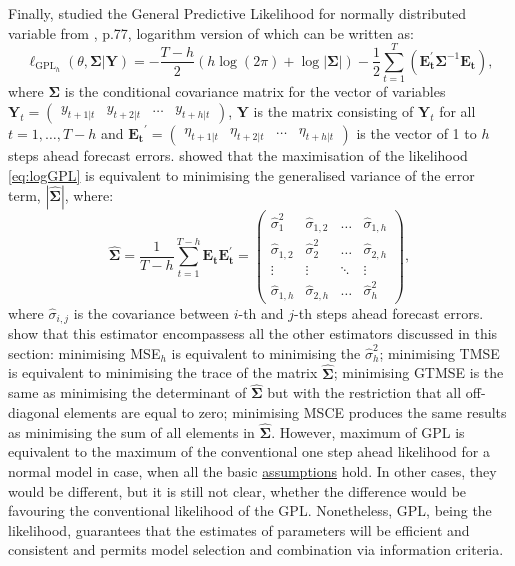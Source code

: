 \documentclass[
]{book}
\theoremstyle{definition}
\theoremstyle{definition}
\theoremstyle{definition}
\theoremstyle{definition}
\theoremstyle{remark}
\begin{document}
Finally, \citet{Svetunkov2020Multistep} studied the General Predictive Likelihood for normally distributed variable from \citet{Clements1998}, p.77, logarithm version of which can be written as:
\begin{equation}
    \ell_{\mathrm{GPL}_h}(\theta, \mathbf{{\Sigma}} | \mathbf{Y}) = -\frac{T-h}{2} \left( h \log(2 \pi) + \log | \mathbf{{\Sigma}}| \right) -\frac{1}{2} \sum_{t=1}^T \left( \mathbf{E_t^\prime} \mathbf{{\Sigma}}^{-1} \mathbf{E_t} \right) ,
  \label{eq:logGPL}
\end{equation}
where \(\mathbf{{\Sigma}}\) is the conditional covariance matrix for the vector of variables \(\mathbf{Y}_t=\begin{pmatrix} y_{t+1|t} & y_{t+2|t} & \ldots & y_{t+h|t} \end{pmatrix}\), \(\mathbf{Y}\) is the matrix consisting of \(\mathbf{Y}_t\) for all \(t=1, \ldots, T-h\) and \(\mathbf{E_t}^{\prime} = \begin{pmatrix} \eta_{t+1|t} & \eta_{t+2|t} & \ldots & \eta_{t+h|t} \end{pmatrix}\) is the vector of 1 to \(h\) steps ahead forecast errors. \citet{Svetunkov2020Multistep} showed that the maximisation of the likelihood \eqref{eq:logGPL} is equivalent to minimising the generalised variance of the error term, \(|\mathbf{\hat{\Sigma}}|\), where:
\begin{equation}
    \mathbf{\hat{\Sigma}} = \frac{1}{T-h} \sum_{t=1}^{T-h} \mathbf{E_t} \mathbf{E_t^\prime} =
    \begin{pmatrix}
        \hat{\sigma}_1^2 & \hat{\sigma}_{1,2} & \dots & \hat{\sigma}_{1,h} \\
        \hat{\sigma}_{1,2} & \hat{\sigma}_2^2 & \dots & \hat{\sigma}_{2,h} \\
        \vdots & \vdots & \ddots & \vdots \\
        \hat{\sigma}_{1,h} & \hat{\sigma}_{2,h} & \dots & \hat{\sigma}_h^2
    \end{pmatrix} ,
    \label{eq:Sigmaest}
\end{equation}
where \(\hat{\sigma}_{i,j}\) is the covariance between \(i\)-th and \(j\)-th steps ahead forecast errors. \citet{Svetunkov2020Multistep} show that this estimator encompassess all the other estimators discussed in this section: minimising MSE\(_h\) is equivalent to minimising the \(\hat{\sigma}^2_{h}\); minimising TMSE is equivalent to minimising the trace of the matrix \(\mathbf{\hat{\Sigma}}\); minimising GTMSE is the same as minimising the determinant of \(\mathbf{\hat{\Sigma}}\) but with the restriction that all off-diagonal elements are equal to zero; minimising MSCE produces the same results as minimising the sum of all elements in \(\mathbf{\hat{\Sigma}}\). However, maximum of GPL is equivalent to the maximum of the conventional one step ahead likelihood for a normal model in case, when all the basic \protect\hyperlink{assumptions}{assumptions} hold. In other cases, they would be different, but it is still not clear, whether the difference would be favouring the conventional likelihood of the GPL. Nonetheless, GPL, being the likelihood, guarantees that the estimates of parameters will be efficient and consistent and permits model selection and combination via information criteria.
\end{document}
